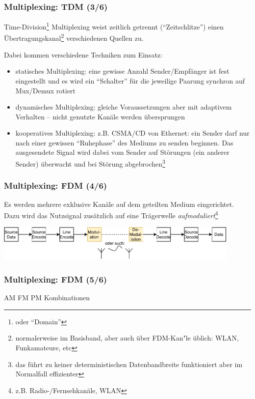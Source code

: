 \documentclass[ignorenonframetext]{beamer}
\begin{document}
\begin{frame}
\frametitle{Multiplexing: TDM (3/6)}
Time-Division\footnote{oder ``Domain''} Multiplexing weist zeitlich getrennt (``Zeitschlitze'') einen \"Ubertragungskanal\footnote{normalerweise im Basisband, aber auch \"uber FDM-Kan\a"le \"ublich: WLAN, Funkamateure, etc} verschiedenen Quellen zu. 

Dabei kommen verschiedene Techniken zum Einsatz:
\begin{itemize}
  \item statisches Multiplexing: eine gewisse Anzahl Sender/Empf\"anger ist fest eingestellt und es wird ein ``Schalter'' f\"ur die jeweilige Paarung synchron auf Mux/Demux rotiert
  \item dynamisches Multiplexing: gleiche Voraussetzungen aber mit adaptivem Verhalten -- nicht genutzte Kan\"ale werden \"ubersprungen
  \item kooperatives Multiplexing: z.B. CSMA/CD von Ethernet: ein Sender darf nur nach einer gewissen ``Ruhephase'' des Mediums zu senden beginnen. Das ausgesendete Signal wird dabei vom Sender auf St\"orungen (ein anderer Sender) \"uberwacht und bei St\"orung abgebrochen\footnote{das f\"uhrt zu keiner deterministischen Datenbandbreite funktioniert aber im Normalfall effizienter}
\end{itemize}
\end{frame}







\begin{frame}
\frametitle{Multiplexing: FDM (4/6)}
Es werden mehrere exklusive Kan\"ale auf dem geteilten Medium eingerichtet. Dazu wird das Nutzsignal zus\"atzlich auf eine Tr\"agerwelle \emph{aufmoduliert}\footnote{z.B. Radio-/Fernsehkan\"ale, WLAN}
\vspace{0.5cm}

\includegraphics[width=12cm]{broadband-circuit}
\end{frame}





\begin{frame}
\frametitle{Multiplexing: FDM (5/6)}
AM
FM
PM
Kombinationen
\end{frame}
\end{document}
